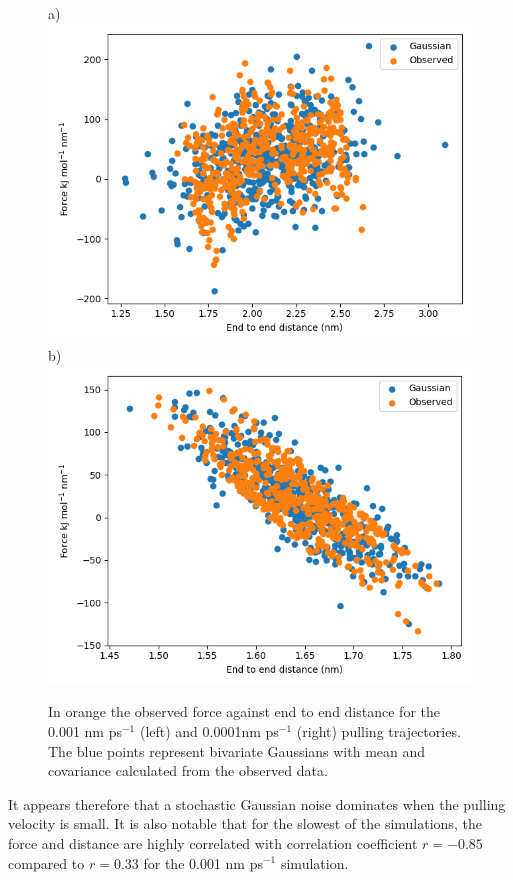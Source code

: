 \documentclass[12pt, onecolumn]{revtex4}    %
\begin{document}
\begin{figure}[h!]
\label{fig: FDGs}
a)\includegraphics[scale=0.4]{FDG1}
b)\includegraphics[scale=0.4]{FDG2}
\caption{In orange the observed force against end to end distance for the 0.001 nm ps$^{-1}$ (left) and 0.0001nm ps$^{-1}$ (right) pulling trajectories.  The blue points represent bivariate Gaussians with mean and covariance calculated from the observed data.}
\end{figure}

It appears therefore that a stochastic Gaussian noise dominates when the pulling velocity is small.  It is also notable that for the slowest of the simulations, the force and distance are highly correlated with correlation coefficient $r = -0.85$ compared to $r = 0.33$ for the 0.001 nm ps$^{-1}$ simulation.\\
\end{document}
